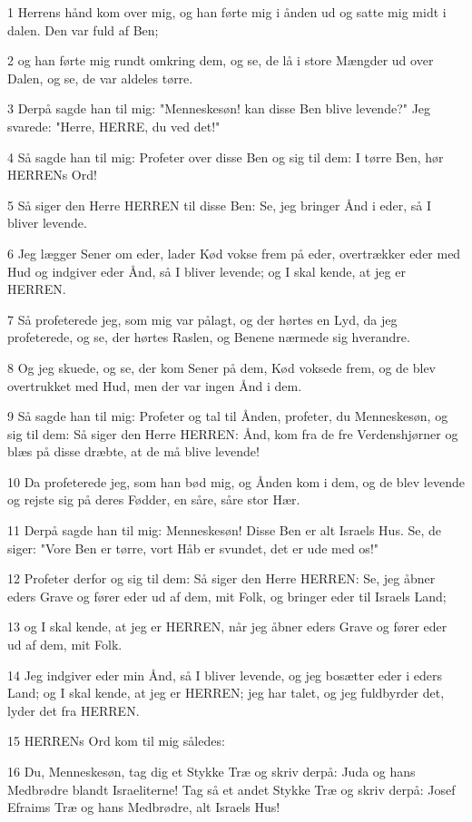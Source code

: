 \par 1 Herrens hånd kom over mig, og han førte mig i ånden ud og satte mig midt i dalen. Den var fuld af Ben;
\par 2 og han førte mig rundt omkring dem, og se, de lå i store Mængder ud over Dalen, og se, de var aldeles tørre.
\par 3 Derpå sagde han til mig: "Menneskesøn! kan disse Ben blive levende?" Jeg svarede: "Herre, HERRE, du ved det!"
\par 4 Så sagde han til mig: Profeter over disse Ben og sig til dem: I tørre Ben, hør HERRENs Ord!
\par 5 Så siger den Herre HERREN til disse Ben: Se, jeg bringer Ånd i eder, så I bliver levende.
\par 6 Jeg lægger Sener om eder, lader Kød vokse frem på eder, overtrækker eder med Hud og indgiver eder Ånd, så I bliver levende; og I skal kende, at jeg er HERREN.
\par 7 Så profeterede jeg, som mig var pålagt, og der hørtes en Lyd, da jeg profeterede, og se, der hørtes Raslen, og Benene nærmede sig hverandre.
\par 8 Og jeg skuede, og se, der kom Sener på dem, Kød voksede frem, og de blev overtrukket med Hud, men der var ingen Ånd i dem.
\par 9 Så sagde han til mig: Profeter og tal til Ånden, profeter, du Menneskesøn, og sig til dem: Så siger den Herre HERREN: Ånd, kom fra de fre Verdenshjørner og blæs på disse dræbte, at de må blive levende!
\par 10 Da profeterede jeg, som han bød mig, og Ånden kom i dem, og de blev levende og rejste sig på deres Fødder, en såre, såre stor Hær.
\par 11 Derpå sagde han til mig: Menneskesøn! Disse Ben er alt Israels Hus. Se, de siger: "Vore Ben er tørre, vort Håb er svundet, det er ude med os!"
\par 12 Profeter derfor og sig til dem: Så siger den Herre HERREN: Se, jeg åbner eders Grave og fører eder ud af dem, mit Folk, og bringer eder til Israels Land;
\par 13 og I skal kende, at jeg er HERREN, når jeg åbner eders Grave og fører eder ud af dem, mit Folk.
\par 14 Jeg indgiver eder min Ånd, så I bliver levende, og jeg bosætter eder i eders Land; og I skal kende, at jeg er HERREN; jeg har talet, og jeg fuldbyrder det, lyder det fra HERREN.
\par 15 HERRENs Ord kom til mig således:
\par 16 Du, Menneskesøn, tag dig et Stykke Træ og skriv derpå: Juda og hans Medbrødre blandt Israeliterne! Tag så et andet Stykke Træ og skriv derpå: Josef Efraims Træ og hans Medbrødre, alt Israels Hus!
